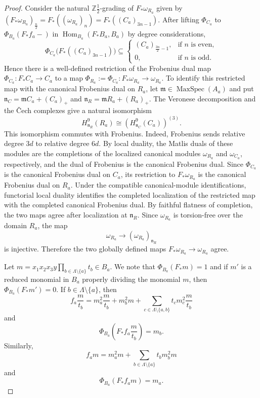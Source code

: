 \documentclass[reqno,11pt]{amsart}
\numberwithin{equation}{section}
\theoremstyle{definition}
\theoremstyle{definition}
\theoremstyle{definition}
\theoremstyle{remark}
\newcommand{\Hom}{\operatorname{Hom}}
\newcommand{\Z}{\mathbb{Z}}
\begin{document}
\begin{proof}
    Consider the natural $\Z \frac{1}2$-grading of $F_*\omega_{R_a}$ given by $(F_*\omega_{R_a})_{\frac{n}{2}} = F_*((\omega_{R_a})_n) = F_*((C_a)_{3n-1})$. After lifting $\Phi_{C_a}$ to $\Phi_{B_a}(F_*f_a-)$ in $\Hom_{B_a}(F_*B_a,B_a)$ by degree considerations, 
    \[
    \Phi_{C_a}\bigl(F_*((C_a)_{3n-1})\bigr)
    \subseteq
    \begin{cases}
        (C_a)_{\frac{3n}{2}-1}, & \text{if $n$ is even},\\
        0, & \text{if $n$ is odd}.
    \end{cases}
    \]
    Hence there is a well-defined restriction of the Frobenius dual map $\Phi_{C_a}:F_*C_a\to C_a$ to a map $\Phi_{R_a}:=\Phi_{C_a}:F_*\omega_{R_a}\to\omega_{R_a}$. To identify this restricted map with the canonical Frobenius dual on
    $R_a$, let $\mathfrak m\in\operatorname{MaxSpec}(A_a)$ and put $\mathfrak n_C=\mathfrak m C_a+(C_a)_+$ and $
    \mathfrak n_R=\mathfrak m R_a+(R_a)_+.$ The Veronese decomposition and the \v{C}ech complexes give a natural
    isomorphism
    \[
    H^9_{\mathfrak n_R}(R_a)
    \cong
    \left(H^9_{\mathfrak n_C}(C_a)\right)^{(3)}.
    \]
    This isomorphism commutes with Frobenius. Indeed, Frobenius sends
    relative degree $3d$ to relative degree $6d$. By local duality, the
    Matlis duals of these modules are the completions of the localized canonical modules
    $\omega_{R_a}$ and $\omega_{C_a}$, respectively, and the dual of
    Frobenius is the canonical Frobenius dual. Since $\Phi_{C_a}$ is the
    canonical Frobenius dual on $C_a$, its restriction to
    $F_*\omega_{R_a}$ is the canonical Frobenius dual on $R_a$. Under the compatible canonical-module identifications, functorial local duality identifies the completed localization of the restricted map with the completed canonical Frobenius dual. By faithful flatness of completion, the two maps agree after localization at $\mathfrak n_R$. Since $\omega_{R_a}$ is torsion-free over the domain $R_a$, the map
    \[
    \omega_{R_a}\longrightarrow(\omega_{R_a})_{\mathfrak n_R}
    \]
    is injective. Therefore the two globally defined maps $F_*\omega_{R_a}\to\omega_{R_a}$ agree.


    Let $m = x_1x_2x_3y\prod_{b\in\Lambda\setminus\{a\}}t_b\in B_a$. We note that $\Phi_{B_a}(F_*m) = 1$ and if $m'$ is a reduced monomial in $B_a$ properly dividing the monomial $m$, then $\Phi_{B_a}(F_*m')=0$. If $b\in \Lambda\setminus\{a\}$, then
    \[
    f_a\frac{m}{t_b} = m_a^2\frac{m}{t_b} + m_b^2m+ \sum_{c\in\Lambda\setminus\{a,b\}}t_cm_c^2\frac{m}{t_b}
    \]
    and
    \[
    \Phi_{B_a}\left(F_*f_a\frac{m}{t_b}\right) = m_b.
    \]
    Similarly,
    \[
    f_am = m_a^2m + \sum_{b\in\Lambda\setminus\{a\}} t_bm_b^2m
    \]
    and
    \[
    \Phi_{B_a}\left(F_*f_am\right)=m_a.
    \]


\end{proof}
\end{document}
